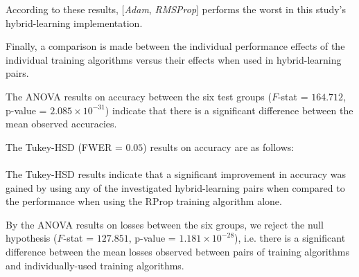 According to these results, [{\sl Adam}, {\sl RMSProp}] performs the worst in this study's hybrid-learning implementation.

Finally, a comparison is made between the individual performance effects of the individual training algorithms versus their 
effects when used in hybrid-learning pairs.

The ANOVA results on accuracy between the six test groups
($F$-stat = $164.712$, p-value = $2.085 \times 10^{-31}$) indicate that there is a significant difference between the 
mean observed accuracies.

The Tukey-HSD (FWER = $0.05$) results on accuracy are as follows: \\

\noindent
{} \\

The Tukey-HSD results indicate that a significant improvement in accuracy was gained by using any of the investigated hybrid-learning pairs when compared
to the performance when using the RProp training algorithm alone.

By the ANOVA results on losses between the six groups, we reject the null hypothesis ($F$-stat = $127.851$, p-value = $1.181 \times 10^{-28}$), i.e. 
there is a significant difference between the 
mean losses observed between pairs of training algorithms and individually-used training algorithms.

